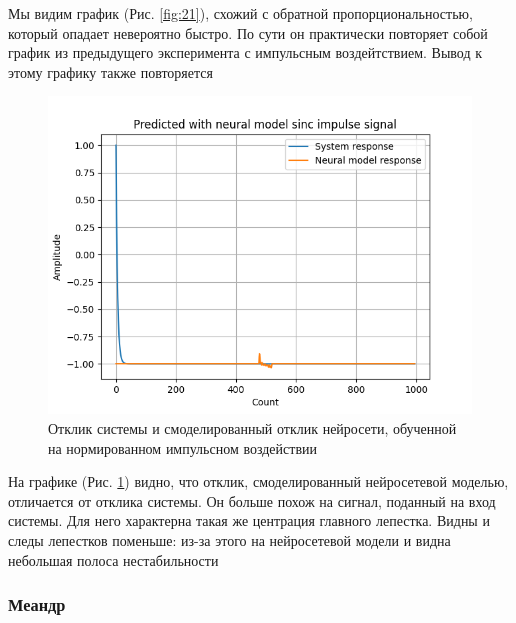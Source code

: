 Мы видим график (Рис. \ref{fig:21}), схожий с обратной пропорциональностью, который опадает невероятно быстро.
По сути он практически повторяет собой график из предыдущего эксперимента с импульсным воздейтствием. Вывод к этому графику также
повторяется

\begin{figure}[H]
	\centering
	\includegraphics[width=1\linewidth]{body/images/Predicted-with-neural-model-sinc-impulse-signal.png}
	\caption{Отклик системы и смоделированный отклик нейросети, обученной на нормированном импульсном воздействии}
	\label{fig:22}
\end{figure}

На графике (Рис. \ref{fig:22}) видно, что отклик, смоделированный нейросетевой моделью, отличается от отклика системы. Он больше
похож на сигнал, поданный на вход системы. Для него характерна такая же центрация главного лепестка. Видны и следы лепестков поменьше: из-за
этого на нейросетевой модели и видна небольшая полоса нестабильности

\subsubsection{Меандр}

